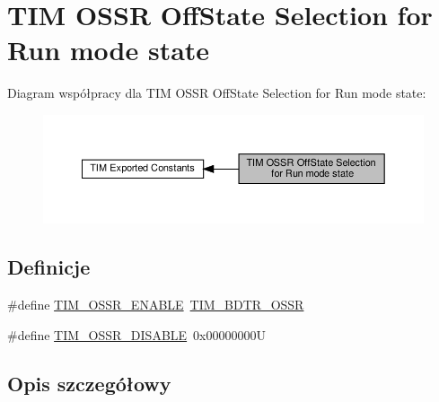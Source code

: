 \hypertarget{group___t_i_m___o_s_s_r___off___state___selection__for___run__mode__state}{}\section{T\+IM O\+S\+SR Off\+State Selection for Run mode state}
\label{group___t_i_m___o_s_s_r___off___state___selection__for___run__mode__state}
Diagram współpracy dla T\+IM O\+S\+SR Off\+State Selection for Run mode state\+:\nopagebreak
\begin{figure}[H]
\begin{center}
\leavevmode
\includegraphics[width=350pt]{group___t_i_m___o_s_s_r___off___state___selection__for___run__mode__state}
\end{center}
\end{figure}
\subsection*{Definicje}
\begin{DoxyCompactItemize}
\item 
\#define \hyperlink{group___t_i_m___o_s_s_r___off___state___selection__for___run__mode__state_ga5d21918f173eca946748a1fbc177daa5}{T\+I\+M\+\_\+\+O\+S\+S\+R\+\_\+\+E\+N\+A\+B\+LE}~\hyperlink{group___peripheral___registers___bits___definition_gaf9435f36d53c6be1107e57ab6a82c16e}{T\+I\+M\+\_\+\+B\+D\+T\+R\+\_\+\+O\+S\+SR}
\item 
\#define \hyperlink{group___t_i_m___o_s_s_r___off___state___selection__for___run__mode__state_gae11820b467ef6d74c90190c8cfce5e73}{T\+I\+M\+\_\+\+O\+S\+S\+R\+\_\+\+D\+I\+S\+A\+B\+LE}~0x00000000U
\end{DoxyCompactItemize}


\subsection{Opis szczegółowy}


